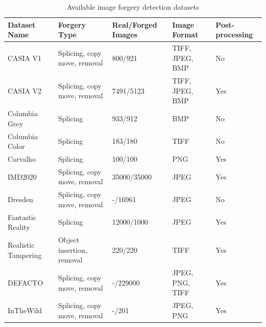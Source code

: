\begin{table}[]
\centering
\renewcommand{\arraystretch}{1.7}
\begin{tabular}{|p{2.2cm}|p{1.8cm}|p{2cm}|p{1.5cm}|p{2.5cm}|}
\hline
Dataset Name & Forgery Type & Real/Forged Images & Image Format & Post-processing \\ \hline
CASIA V1 & Splicing, copy move, removal & 800/921 & TIFF, JPEG, BMP & No \\ \hline
CASIA V2 & Splicing, copy move, removal & 7491/5123 & TIFF, JPEG, BMP & Yes \\\hline
Columbia Grey & Splicing & 933/912 & BMP & No \\\hline
Columbia Color & Splicing & 183/180 & TIFF & No \\\hline
Carvalho & Splicing & 100/100 & PNG & Yes \\\hline
IMD2020 & Splicing, copy move, removal & 35000/35000 & JPEG & Yes \\\hline
Dresden & Splicing, copy move, removal & -/16961 & JPEG & No \\\hline
Fantastic Reality & Splicing & 12000/1000 & JPEG & Yes \\\hline
Realistic Tampering & Object insertion, removal & 220/220 & TIFF & Yes \\\hline
DEFACTO & Splicing, copy move, removal & -/229000 & JPEG, PNG, TIFF & Yes \\\hline
InTheWild & Splicing, copy move, removal & -/201 & JPEG, PNG & Yes \\\hline
\end{tabular}
\caption{Available image forgery detection datasets}
\label{table:datasets}
\end{table}



